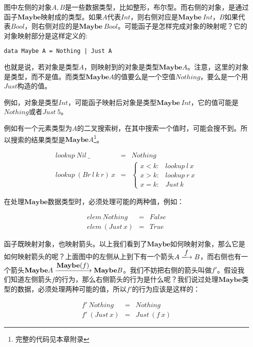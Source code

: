 \documentclass{article}
\begin{document}
\begin{example}
图中左侧的对象$A, B$是一些数据类型，比如整形，布尔型。而右侧的对象，是通过函子$\mathbf{Maybe}$映射成的类型。如果$A$代表$Int$，则右侧对应是$\mathbf{Maybe}\ Int$，$B$如果代表$Bool$，则右侧对应的是$\mathbf{Maybe}\ Bool$。可能函子是怎样完成对象的映射呢？它的对象映射部分是这样定义的:

\lstset{frame=none}
\begin{lstlisting}
data Maybe A = Nothing | Just A
\end{lstlisting}

也就是说，若对象是类型$A$，则映射到的对象是类型$\mathbf{Maybe}A$。注意，这里的对象是类型，而不是值。而类型$\mathbf{Maybe}A$的值要么是一个空值$Nothing$，要么是一个用$Just$构造的值。

例如，对象是类型$Int$，可能函子映射后对象是类型$\mathbf{Maybe}\ Int$，它的值可能是$Nothing$或者$Just\ 5$。

例如有一个元素类型为$A$的二叉搜索树，在其中搜索一个值时，可能会搜不到。所以搜索的结果类型是$\mathbf{Maybe}A$\footnote{完整的代码见本章附录}。

\[
\begin{array}{rcl}
lookup\ Nil\ \_ & = & Nothing \\
lookup\ (Br\ l\ k\ r)\ x & = & \begin{cases}
  x < k: & lookup\ l\ x \\
  x > k: & lookup\ r\ x \\
  x = k: & Just\ k
\end{cases}
\end{array}
\]

在处理$\mathbf{Maybe}$数据类型时，必须处理可能的两种值，例如：

\[
\begin{array}{rcl}
elem\ Nothing & = & False \\
elem\ (Just\ x) & = & True
\end{array}
\]

函子既映射对象，也映射箭头。以上我们看到了$\mathbf{Maybe}$如何映射对象，那么它是如何映射箭头的呢？上面图中的左侧从上到下有一个箭头$A \arrowto{f} B$，而右侧也有一个箭头$\mathbf{Maybe}A \arrowto{\mathbf{Maybe}(f)} \mathbf{Maybe}B$。我们不妨把右侧的箭头叫做$f'$。假设我们知道左侧箭头$f$的行为，那么右侧箭头的行为是什么呢？我们说过处理$\mathbf{Maybe}$类型的数据，必须处理两种可能的值，所以$f'$的行为应该是这样的：

\[
\begin{array}{rcl}
f'\ Nothing & = & Nothing \\
f'\ (Just\ x) & = & Just\ (f\ x)
\end{array}
\]


\end{example}
\end{document}
